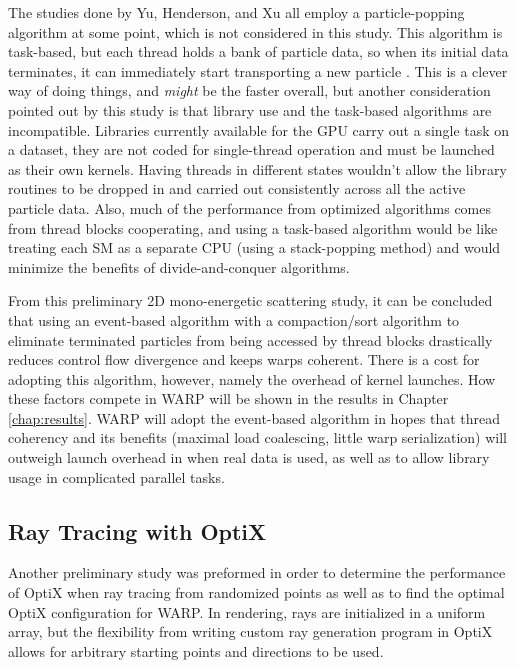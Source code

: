 The studies done by Yu, Henderson, and Xu all employ a particle-popping algorithm at some point, which is not considered in this study.  This algorithm is task-based, but each thread holds a bank of particle data, so when its initial data terminates, it can immediately start transporting a new particle \cite{tianyu, henderson, qixu}.  This is a clever way of doing things, and \emph{might} be the faster overall, but another consideration pointed out by this study is that library use and the task-based algorithms are incompatible.  Libraries currently available for the GPU carry out a single task on a dataset, they are not coded for single-thread operation and must be launched as their own kernels.  Having threads in different states wouldn't allow the library routines to be dropped in and carried out consistently across all the active particle data.  Also, much of the performance from optimized algorithms comes from thread blocks cooperating, and using a task-based algorithm would be like treating each SM as a separate CPU (using a stack-popping method) and would minimize the benefits of divide-and-conquer algorithms.

From this preliminary 2D mono-energetic scattering study, it can be concluded that using an event-based algorithm with a compaction/sort algorithm to eliminate terminated particles from being accessed by thread blocks drastically reduces control flow divergence and keeps warps coherent.  There is a cost for adopting this algorithm, however, namely the overhead of kernel launches.  How these factors compete in WARP will be shown in the results in Chapter \ref{chap:results}.  WARP will adopt the event-based algorithm in hopes that thread coherency and its benefits (maximal load coalescing, little warp serialization) will outweigh launch overhead in when real data is used, as well as to allow library usage in complicated parallel tasks.

\subsection{Ray Tracing with OptiX}

Another preliminary study was preformed in order to determine the performance of OptiX when ray tracing from randomized points as well as to find the optimal OptiX configuration for WARP.  In rendering, rays are initialized in a uniform array, but the flexibility from writing custom ray generation program in OptiX allows for arbitrary starting points and directions to be used.


